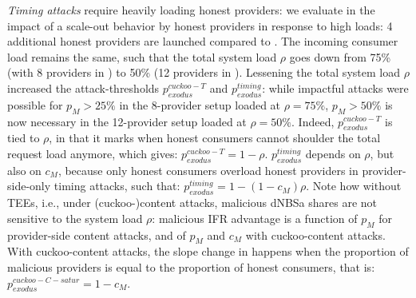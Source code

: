\emph{Timing attacks} require heavily loading honest providers: we evaluate in  the impact of a scale-out behavior by honest providers in response to high loads: 4 additional honest providers are launched compared to .
The incoming consumer load remains the same, such that the total system load $\rho$ goes down from 75\% (with 8 providers in ) to 50\% (12 providers in ).
Lessening the total system load $\rho$ increased the attack-thresholds $p_{exodus}^{cuckoo-T}$ and $p_{exodus}^{timing}$: 
while impactful attacks were possible for $p_{M}>25\%$ in the 8-provider setup loaded at $\rho=75\%$, $p_{M}>50\%$ is now necessary in the 12-provider setup loaded at $\rho=50\%$. 
Indeed, $p_{exodus}^{cuckoo-T}$ is tied to $\rho$, in that it marks when honest consumers cannot shoulder the total request load anymore, which gives: $p_{exodus}^{cuckoo-T}= 1-\rho$.
$p_{exodus}^{timing}$ depends on $\rho$, but also on $c_{M}$, because only honest consumers overload honest providers in provider-side-only timing attacks, such that: 
$p_{exodus}^{timing}= 1-(1-c_{M})\rho$.
Note how without TEEs, i.e., under (cuckoo-)content attacks, malicious dNBSa shares are not sensitive to the system load $\rho$: malicious IFR advantage is a function of $p_{M}$ for provider-side content attacks, and of $p_{M}$ and $c_{M}$ with cuckoo-content attacks.
With cuckoo-content attacks, the slope change in  happens when the proportion of malicious providers is equal to the proportion of honest consumers, that is:
$p_{exodus}^{cuckoo-C-satur}= 1-c_{M}$.

